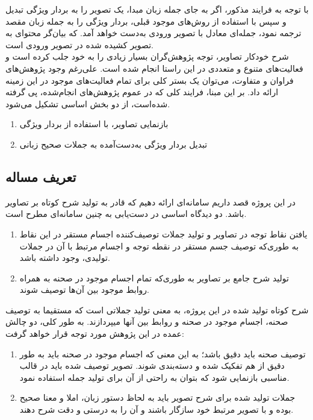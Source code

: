 با توجه به فرایند مذکور، اگر به جای جمله زبان مبدا، یک تصویر را به بردار ویژگی تبدیل و سپس با استفاده از روش‌های موجود قبلی، بردار ویژگی را به جمله زبان مقصد ترجمه نمود، جمله‌ای معادل با تصویر ورودی به‌دست خواهد آمد. که بیان‌گر محتوای به تصویر کشیده شده در تصویر ورودی است.
\\
شرح خودکار تصاویر، توجه پژوهش‌گران بسیار زیادی را به خود جلب کرده است و فعالیت‌های متنوع و متعددی در این راستا انجام شده است. علی‌رغم وجود پژوهش‌‌های فراوان و متفاوت، می‌توان یک بستر کلی برای تمام فعالیت‌های موجود در این زمینه ارائه داد. بر این مبنا، فرایند کلی که در عموم پژوهش‌های انجام‌شده، پی گرفته شده‌است، از دو بخش اساسی تشکیل می‌شود.
\begin{enumerate}
\item بازنمایی تصاویر، با استفاده از بردار ویژگی
\item تبدیل بردار ويژگی به‌دست‌آمده به جملات صحیح زبانی
\end{enumerate}


\subsection{تعریف مساله}
در این پروژه قصد داریم سامانه‌ای ارائه دهیم که قادر به تولید شرح کوتاه بر تصاویر باشد. دو دیدگاه اساسی در دست‌یابی به چنین سامانه‌ای مطرح است.
\begin{enumerate}
\item
 یافتن نقاط توجه 
در تصاویر و تولید جملات توصیف‌کننده اجسام مستقر در این نقاط به طوری‌که توصیف جسم مستقر در نقطه توجه و اجسام مرتبط با آن در جملات تولیدی، وجود داشته باشد.
\item  تولید شرح جامع بر تصاویر به طوری‌که تمام اجسام موجود در صحنه به همراه روابط موجود بین آن‌ها توصیف شوند. 
\end{enumerate}

شرح کوتاه تولید شده در این پروژه، به معنی تولید جملاتی است که مستقیما به توصیف صحنه، اجسام موجود در صحنه و روابط بین آن­ها می­پردازند.
به طور کلی، دو چالش عمده در این پژوهش مورد توجه قرار خواهد گرفت:
\begin{enumerate}
\item  توصیف صحنه باید دقیق باشد؛ به این معنی که اجسام موجود در صحنه باید به طور دقیق از هم تفکیک شده و دسته‌بندی شوند. تصویر توصیف شده باید در قالب مناسبی بازنمایی شود که بتوان به راحتی از آن برای تولید جمله استفاده نمود.
\item  جملات تولید شده برای شرح تصویر باید به لحاظ دستور زبان، املا و معنا صحیح بوده و با تصویر مرتبط خود سازگار باشند و آن را به درستی و دقت شرح دهند.
\end{enumerate}
